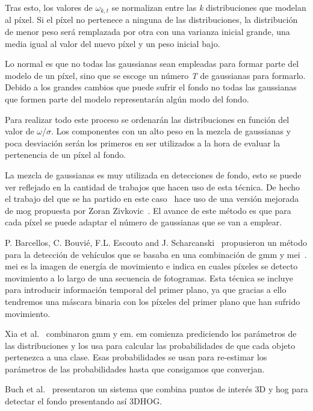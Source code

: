 Tras esto, los valores de $\omega_{k,t}$ se normalizan entre las \textit{k} distribuciones que modelan al píxel. Si  el píxel  no  pertenece  a  ninguna  de  las  distribuciones,  la  distribución  de menor peso será remplazada por otra con una varianza inicial grande, una media igual al valor del nuevo píxel y un peso inicial bajo.

Lo normal es que no todas las gaussianas sean empleadas para formar parte del modelo de un píxel, sino que se escoge un número \textit{T} de gaussianas para formarlo. Debido a los grandes cambios que puede sufrir el fondo no todas las gaussianas que formen parte del modelo representarán algún modo del fondo.

Para realizar todo este proceso se ordenarán las distribuciones en función del valor de $\omega$/$\sigma$. Los componentes con un alto peso en la mezcla de gaussianas y poca desviación serán los primeros en ser utilizados a la hora de evaluar la pertenencia de un píxel al fondo.

La mezcla de gaussianas es muy utilizada en detecciones de fondo, esto se puede ver reflejado en la cantidad de trabajos que hacen uso de esta técnica. De hecho el trabajo del que se ha partido en este caso~\cite{redo_tesis} hace uso de una versión mejorada de \acrshort{mog} propuesta por Zoran Zivkovic~\cite{zoran_zivkovic}. El avance de este método es que para cada píxel se puede adaptar el número de gaussianas que se van a emplear.


P. Barcellos, C. Bouvié, F.L. Escouto and  J. Scharcanski~\cite{gmm_mei_article} propusieron un método para la detección de vehículos que se basaba en una combinación de \acrfull{gmm} y \acrfull{mei}~\cite{mei_article}. \acrshort{mei} es la imagen de energía de movimiento e indica en cuales píxeles se detecto movimiento a lo largo de una secuencia de fotogramas. Esta técnica se incluye para introducir información temporal del primer plano, ya que gracias a ello tendremos una máscara binaria con los píxeles del primer plano que han sufrido movimiento.

Xia et al.~\cite{gmm_em_article} combinaron \acrshort{gmm} y \acrfull{em}. \acrshort{em} comienza prediciendo los parámetros de las distribuciones y los usa para calcular las probabilidades de que cada objeto pertenezca a una clase. Esas probabilidades se usan para re-estimar los parámetros de las probabilidades hasta que consigamos que converjan. 

Buch et al.~\cite{3dhog_article}  presentaron un sistema que combina  puntos de interés 3D y \acrfull{hog} para detectar el fondo presentando así 3DHOG.


